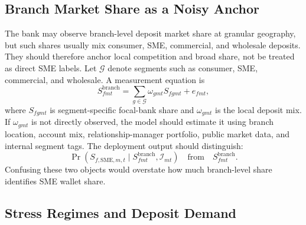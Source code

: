 \documentclass[11pt]{article}
\begin{document}
\subsection{Branch Market Share as a Noisy Anchor}

The bank may observe branch-level deposit market share at granular geography,
but such shares usually mix consumer, SME, commercial, and wholesale deposits.
They should therefore anchor local competition and broad share, not be treated
as direct SME labels. Let $\mathcal{G}$ denote segments such as consumer, SME,
commercial, and wholesale. A measurement equation is
\[
  S_{fmt}^{\mathrm{branch}}
  =
  \sum_{g\in\mathcal{G}}\omega_{gmt}S_{fgmt}
  +e_{fmt},
\]
where $S_{fgmt}$ is segment-specific focal-bank share and $\omega_{gmt}$ is the
local deposit mix. If $\omega_{gmt}$ is not directly observed, the model should
estimate it using branch location, account mix, relationship-manager portfolio,
public market data, and internal segment tags. The deployment output should
distinguish:
\[
  \Pr(S_{f,\mathrm{SME},m,t}\mid S_{fmt}^{\mathrm{branch}},\mathcal{I}_{mt})
  \quad\text{from}\quad
  S_{fmt}^{\mathrm{branch}}.
\]
Confusing these two objects would overstate how much branch-level share
identifies SME wallet share.

\subsection{Stress Regimes and Deposit Demand}
\end{document}
